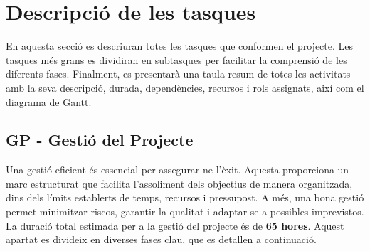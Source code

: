 \documentclass[a4paper,12pt]{report}
\begin{document}
\section{Descripció de les tasques}

En aquesta secció es descriuran totes les tasques que conformen el projecte.
Les tasques més grans es dividiran en subtasques per facilitar la comprensió de les diferents fases.
Finalment, es presentarà una taula resum de totes les activitats amb la seva descripció, durada, dependències, recursos i rols assignats, així com el diagrama de Gantt.

\subsection{GP - Gestió del Projecte}

Una gestió eficient és essencial per assegurar-ne l’èxit.
Aquesta proporciona un marc estructurat que facilita l’assoliment dels objectius de manera organitzada, dins dels límits establerts de temps, recursos i pressupost.
A més, una bona gestió permet minimitzar riscos, garantir la qualitat i adaptar-se a possibles imprevistos.
La duració total estimada per a la gestió del projecte és de \textbf{65 hores}. Aquest apartat es divideix en diverses fases clau, que es detallen a continuació.
\end{document}
